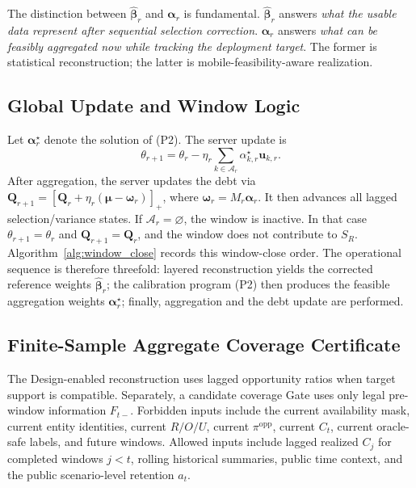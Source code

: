 \documentclass[letterpaper,journal]{IEEEtran}
\begin{document}
The distinction between
$\widehat{\boldsymbol\beta}_r$ and $\boldsymbol\alpha_r$ is fundamental.
$\widehat{\boldsymbol\beta}_r$ answers \emph{what the usable data
represent after sequential selection correction}.  $\boldsymbol\alpha_r$
answers \emph{what can be feasibly aggregated now while tracking the
deployment target}.  The former is statistical reconstruction; the
latter is mobile-feasibility-aware realization.

\subsection{Global Update and Window Logic}
\label{subsec:global_update}

Let $\boldsymbol\alpha_r^\star$ denote the solution of (P2).  The server update
is
\begin{equation}
 \theta_{r+1}
 =
 \theta_r
 -
 \eta_r
 \sum_{k\in\mathcal{A}_r}
 \alpha^\star_{k,r}\mathbf{u}_{k,r}.
 \label{eq:server_update}
\end{equation}
After aggregation, the server updates the debt via
$\mathbf{Q}_{r+1}=\left[\mathbf{Q}_r+\eta_r(\boldsymbol\mu-\boldsymbol\omega_r)\right]_+$,
where $\boldsymbol\omega_r=M_r\boldsymbol\alpha_r$.  It then advances all
lagged selection/variance states.  If
$\mathcal{A}_r=\varnothing$, the window is inactive.  In that case
$\theta_{r+1}=\theta_r$ and $\mathbf{Q}_{r+1}=\mathbf{Q}_r$, and the window
does not contribute to $S_R$.  Algorithm~\ref{alg:window_close}
records this window-close order.  The operational sequence is therefore
threefold: layered reconstruction yields the corrected reference weights
$\widehat{\boldsymbol\beta}_r$; the calibration program (P2) then produces the
feasible aggregation weights $\boldsymbol\alpha_r^\star$; finally, aggregation
and the debt update are performed.

\subsection{Finite-Sample Aggregate Coverage Certificate}
\label{subsec:agg_certificate_alg}

The Design-enabled reconstruction uses lagged opportunity ratios when
target support is compatible.  Separately, a candidate coverage Gate uses
only legal pre-window information $F_{t-}$.  Forbidden
inputs include the current availability mask, current entity identities,
current $R/O/U$, current $\pi^{\mathrm{opp}}$, current $C_t$, current
oracle-safe labels, and future windows.  Allowed inputs include lagged
realized $C_j$ for completed windows $j<t$, rolling historical summaries,
public time context, and the public scenario-level retention $a_t$.
\end{document}
